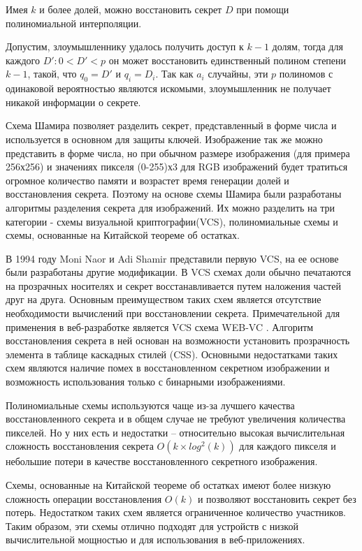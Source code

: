 \documentclass[a4paper,article,14pt]{extarticle}
\begin{document}
Имея $k$ и более долей, можно восстановить секрет $D$ при помощи полиномиальной интерполяции.

Допустим, злоумышленнику удалось получить доступ к $k-1$ долям, тогда для каждого $D': 0<D'<p$ он может восстановить единственный полином степени $k-1$, такой, что $q_0=D'$ и 
$q_i=D_i$. Так как $a_i$ случайны, эти $p$ полиномов с одинаковой вероятностью являются искомыми, злоумышленник не получает никакой
информации о секрете. 

Схема Шамира позволяет разделить секрет, представленный в форме числа и используется в основном для защиты ключей. Изображение так же 
можно представить в форме числа, но при обычном размере изображения (для примера 256х256) и значениях пикселя (0-255)х3 для RGB изображений
будет тратиться огромное количество памяти и возрастет время генерации долей и восстановления секрета. Поэтому на основе схемы Шамира были разработаны алгоритмы разделения секрета для изображений. 
Их можно разделить на три категории - схемы визуальной криптографии(VCS), полиномиальные схемы и схемы, основанные на Китайской теореме об остатках. 

В 1994 году Moni Naor и Adi Shamir \cite{shamir_VCS} представили первую VCS, на ее основе были разработаны другие модификации.
В VCS схемах доли обычно печатаются на прозрачных носителях и секрет восстанавливается путем наложения частей друг на друга. 
Основным преимуществом таких схем является отсутствие необходимости вычислений при восстановлении секрета.
Примечательной для применения в веб-разработке является VCS схема WEB-VC \cite{WEB-VC}. Алгоритм восстановления секрета в ней основан 
на возможности установить прозрачность элемента в таблице каскадных стилей (CSS). Основными недостатками таких схем являются 
наличие помех в восстановленном секретном изображении и возможность использования только с бинарными изображениями.

Полиномиальные схемы используются чаще из-за лучшего качества восстановленного секрета и в общем случае 
не требуют увеличения количества пикселей. Но у них есть и недостатки -- относительно высокая вычислительная сложность 
восстановления секрета $O(k \times log^2(k))$ для каждого пикселя и небольшие потери в качестве восстановленного секретного изображения.

Схемы, основанные на Китайской теореме об остатках имеют более низкую сложность операции восстановления $O(k)$ и позволяют 
восстановить секрет без потерь. Недостатком таких схем является ограниченное количество участников\cite{CRTSIS}. Таким образом, 
эти схемы отлично подходят для устройств с низкой вычислительной мощностью и для использования в веб-приложениях.
\end{document}

